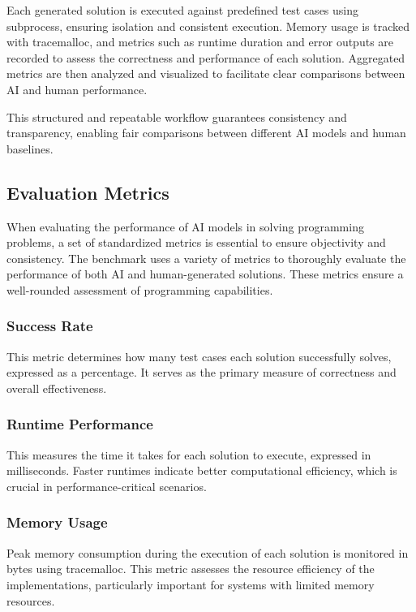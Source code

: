 Each generated solution is executed against predefined test cases using subprocess, ensuring isolation and consistent execution. Memory usage is tracked with tracemalloc, and metrics such as runtime duration and error outputs are recorded to assess the correctness and performance of each solution. Aggregated metrics are then analyzed and visualized to facilitate clear comparisons between AI and human performance.

This structured and repeatable workflow guarantees consistency and transparency, enabling fair comparisons between different AI models and human baselines.




\subsection{Evaluation Metrics}

When evaluating the performance of AI models in solving programming problems, a set of standardized metrics is essential to ensure objectivity and consistency.
The benchmark uses a variety of metrics to thoroughly evaluate the performance of both AI and human-generated solutions. These metrics ensure a well-rounded assessment of programming capabilities.

\subsubsection{Success Rate}

This metric determines how many test cases each solution successfully solves, expressed as a percentage. It serves as the primary measure of correctness and overall effectiveness.

\subsubsection{Runtime Performance} 

This measures the time it takes for each solution to execute, expressed in milliseconds. Faster runtimes indicate better computational efficiency, which is crucial in performance-critical scenarios.

\subsubsection{Memory Usage} 

Peak memory consumption during the execution of each solution is monitored in bytes using tracemalloc. This metric assesses the resource efficiency of the implementations, particularly important for systems with limited memory resources.





